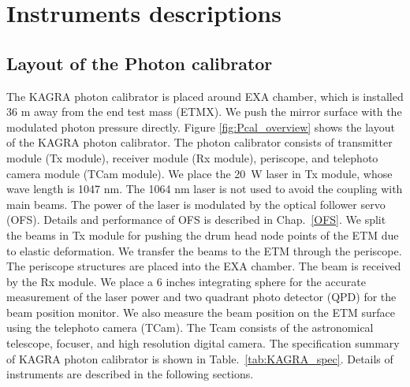

\chapter{Instruments descriptions} %

\label{Chapter3} %




\section{Layout of the Photon calibrator}
The KAGRA photon calibrator is placed around EXA chamber, which is installed 36 m away from the end test mass (ETMX). We push the mirror surface with the modulated photon pressure directly. Figure \ref{fig:Pcal_overview} shows the layout of the KAGRA photon calibrator. The photon calibrator consists of transmitter module (Tx module), receiver module (Rx module), periscope, and telephoto camera module (TCam module). We place the 20~W laser in Tx module, whose wave length is 1047 nm. The 1064 nm laser is not used to avoid the coupling with main beams.   The power of the laser is modulated by the optical follower servo (OFS). Details and performance of OFS is described in Chap.~\ref{OFS}. We split the beams in Tx module for pushing the drum head node points of the ETM due to elastic deformation. We transfer the beams to the ETM through the periscope. The periscope structures are placed into the EXA chamber. The beam is received by the Rx module. We place a 6 inches integrating sphere for the accurate measurement of the laser power and two quadrant photo detector (QPD) for the beam position monitor. We also measure the beam position on the ETM surface using the telephoto camera (TCam). The Tcam consists of the astronomical telescope, focuser, and high resolution digital camera. The specification summary of KAGRA photon calibrator is shown in Table.~\ref{tab:KAGRA_spec}. Details of instruments are described in the following sections.
